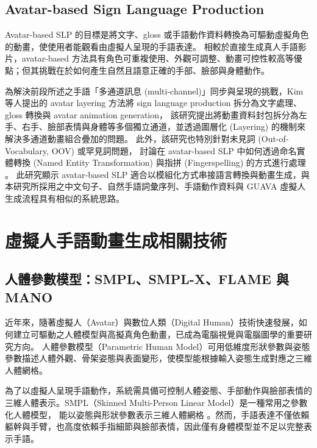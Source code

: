 \documentclass[class=NCU_thesis, crop=false]{standalone}
\begin{document}
\subsection{Avatar-based Sign Language Production}
\label{subsec:avatar_based_slp}

Avatar-based SLP 的目標是將文字、gloss 或手語動作資料轉換為可驅動虛擬角色的動畫，使使用者能觀看由虛擬人呈現的手語表達。
相較於直接生成真人手語影片，avatar-based 方法具有角色可重複使用、外觀可調整、動畫可控性較高等優點；但其挑戰在於如何產生自然且語意正確的手部、臉部與身體動作。

為解決前段所述之手語「多通道訊息 (multi-channel)」同步與呈現的挑戰，Kim 等人提出的 avatar layering 方法將 sign language production 拆分為文字處理、gloss 轉換與 avatar animation generation，
該研究提出將動畫資料封包拆分為左手、右手、臉部表情與身體等多個獨立通道，並透過圖層化 (Layering) 的機制來解決多通道動畫組合疊加的問題。
此外，該研究也特別針對未見詞 (Out-of-Vocabulary, OOV) 或罕見詞問題，
討論在 avatar-based SLP 中如何透過命名實體轉換 (Named Entity Transformation) 與指拼 (Fingerspelling) 的方式進行處理 \cite{kim2022sign}。
此研究顯示 avatar-based SLP 適合以模組化方式串接語言轉換與動畫生成，與本研究所採用之中文句子、自然手語詞彙序列、手語動作資料與 GUAVA 虛擬人生成流程具有相似的系統思路。


\section{虛擬人手語動畫生成相關技術}
\label{sec:avatar_animation_generation}

\subsection{人體參數模型：SMPL、SMPL-X、FLAME 與 MANO}
\label{subsec:parametric_human_models}

近年來，隨著虛擬人（Avatar）與數位人類（Digital Human）技術快速發展，如何建立可驅動之人體模型與高擬真角色動畫，已成為電腦視覺與電腦圖學的重要研究方向。
人體參數模型（Parametric Human Model）可用低維度形狀參數與姿態參數描述人體外觀、骨架姿態與表面變形，使模型能根據輸入姿態生成對應之三維人體網格。

為了以虛擬人呈現手語動作，系統需具備可控制人體姿態、手部動作與臉部表情的三維人體表示。SMPL（Skinned Multi-Person Linear Model）是一種常用之參數化人體模型，
能以姿態與形狀參數表示三維人體網格 \cite{SMPL:2015}。然而，手語表達不僅依賴軀幹與手臂，也高度依賴手指細節與臉部表情，因此僅有身體模型並不足以完整表示手語。
\end{document}
